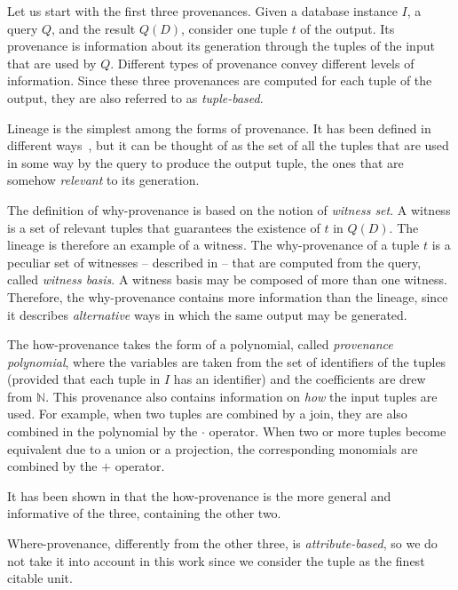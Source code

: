 Let us start with the first three provenances. Given a database instance $I$, a query $Q$, and the result $Q(D)$, consider one tuple $t$ of the output. 
Its provenance is information about its generation through the tuples of the input that are used by $Q$. Different types of provenance convey different levels of information. Since these three provenances are computed for each tuple of the output, they are also referred to as \emph{tuple-based}.

Lineage is the simplest among the forms of provenance. It has been defined in different ways~\citep{CheneyProvSurvey}, but it can be thought of as the set of all the tuples that are used in some way by the query to produce the output tuple, the ones that are somehow \emph{relevant} to its generation. 

The definition of why-provenance is based on the notion of \emph{witness set}. A witness is a set of relevant tuples that guarantees the existence of $t$ in $Q(D)$. The lineage is therefore an example of a witness. The why-provenance of a tuple $t$ is a peculiar set of witnesses  -- described in \citep{WhyProvBuneman} -- that are computed from the query, called \emph{witness basis}. 
A witness basis may be composed of more than one witness. 
Therefore, the why-provenance contains more information than the lineage, since it describes \emph{alternative} ways in which the same output may be generated. 

The how-provenance takes the form of a polynomial, called \emph{provenance polynomial}, where the variables are taken from the set of identifiers of the tuples (provided that each tuple in $I$ has an identifier) and the coefficients are drew from $\mathbb{N}$. 
This provenance also contains information on \emph{how} the input tuples are used. For example, when two tuples are combined by a join, they are also combined in the polynomial by the $\cdot$ operator. When two or more tuples become equivalent due to a union or a projection, the corresponding monomials are combined by the $+$ operator.

It has been shown in \citep{CheneyProvSurvey} that the how-provenance is the more general and informative of the three, containing the other two.

Where-provenance, differently from the other three, is \emph{attribute-based}, so we do not take it into account in this work since we consider the tuple as the finest citable unit. 
